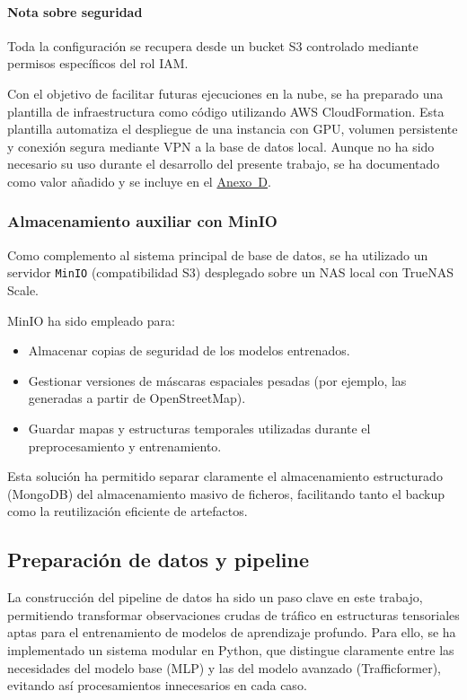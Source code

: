 \paragraph*{Nota sobre seguridad} 

Toda la configuración se recupera desde un bucket S3 controlado mediante permisos específicos del rol IAM.

Con el objetivo de facilitar futuras ejecuciones en la nube, se ha preparado una plantilla de infraestructura como código utilizando AWS CloudFormation. Esta plantilla automatiza el despliegue de una instancia con GPU, volumen persistente y conexión segura mediante VPN a la base de datos local. Aunque no ha sido necesario su uso durante el desarrollo del presente trabajo, se ha documentado como valor añadido y se incluye en el \hyperref[anexo:plantilla_aws]{Anexo~D}.

\subsubsection*{Almacenamiento auxiliar con MinIO}

Como complemento al sistema principal de base de datos, se ha utilizado un servidor \texttt{MinIO} (compatibilidad S3) desplegado sobre un NAS local con TrueNAS Scale.

MinIO ha sido empleado para:

\begin{itemize}
	\item Almacenar copias de seguridad de los modelos entrenados.
	\item Gestionar versiones de máscaras espaciales pesadas (por ejemplo, las generadas a partir de OpenStreetMap).
	\item Guardar mapas y estructuras temporales utilizadas durante el preprocesamiento y entrenamiento.
\end{itemize}

Esta solución ha permitido separar claramente el almacenamiento estructurado (MongoDB) del almacenamiento masivo de ficheros, facilitando tanto el backup como la reutilización eficiente de artefactos.


\subsection{Preparación de datos y pipeline}
\label{sec:prep_datos_pipeline}

La construcción del pipeline de datos ha sido un paso clave en este trabajo, permitiendo transformar observaciones crudas de tráfico en estructuras tensoriales aptas para el entrenamiento de modelos de aprendizaje profundo. Para ello, se ha implementado un sistema modular en Python, que distingue claramente entre las necesidades del modelo base (MLP) y las del modelo avanzado (Trafficformer), evitando así procesamientos innecesarios en cada caso.

